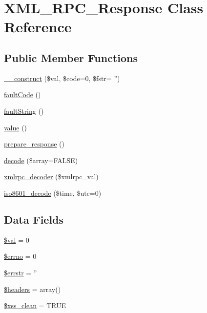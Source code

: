\hypertarget{class_x_m_l___r_p_c___response}{\section{X\-M\-L\-\_\-\-R\-P\-C\-\_\-\-Response Class Reference}
\label{class_x_m_l___r_p_c___response}
}
\subsection*{Public Member Functions}
\begin{DoxyCompactItemize}
\item 
\hyperlink{class_x_m_l___r_p_c___response_a70b762dc61367e2f90588f3c012d3fc2}{\-\_\-\-\_\-construct} (\$val, \$code=0, \$fstr= '')
\item 
\hyperlink{class_x_m_l___r_p_c___response_ad6849a82f23db4d67e06a7fcaa94aec2}{fault\-Code} ()
\item 
\hyperlink{class_x_m_l___r_p_c___response_a2f922009ed0801616d3df198a48d193b}{fault\-String} ()
\item 
\hyperlink{class_x_m_l___r_p_c___response_aefbfa229f1c9e1fc967bff724a010f9e}{value} ()
\item 
\hyperlink{class_x_m_l___r_p_c___response_ac6925a06291928e6d4e8e53ea10fb1e2}{prepare\-\_\-response} ()
\item 
\hyperlink{class_x_m_l___r_p_c___response_ac6d3a837a513ce8070066e57d2faba37}{decode} (\$array=F\-A\-L\-S\-E)
\item 
\hyperlink{class_x_m_l___r_p_c___response_a44f453c58a4aad3ccb76dd9926f9fa64}{xmlrpc\-\_\-decoder} (\$xmlrpc\-\_\-val)
\item 
\hyperlink{class_x_m_l___r_p_c___response_a5e4eb752a438645f415cf3036004f3c7}{iso8601\-\_\-decode} (\$time, \$utc=0)
\end{DoxyCompactItemize}
\subsection*{Data Fields}
\begin{DoxyCompactItemize}
\item 
\hyperlink{class_x_m_l___r_p_c___response_aac81a74a7b30767af29bfd9a695636df}{\$val} = 0
\item 
\hyperlink{class_x_m_l___r_p_c___response_a2be10a914e39a6b1f855ddf3b9a21367}{\$errno} = 0
\item 
\hyperlink{class_x_m_l___r_p_c___response_a126a4369646afcf007816bfa8c208d11}{\$errstr} = ''
\item 
\hyperlink{class_x_m_l___r_p_c___response_a52500036ee807241b8b4b7e2367c49ef}{\$headers} = array()
\item 
\hyperlink{class_x_m_l___r_p_c___response_a0f2ee8861c0b3164a5c6e126dd98c0cc}{\$xss\-\_\-clean} = T\-R\-U\-E
\end{DoxyCompactItemize}



